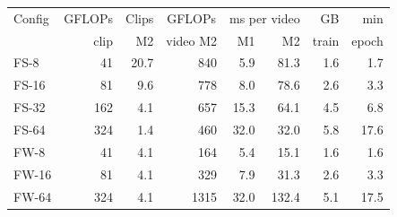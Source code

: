 \begin{tabular}{lrrrrrrr}
\toprule
Config & \multicolumn{1}{c}{GFLOPs} & Clips & \multicolumn{1}{c}{GFLOPs} & \multicolumn{2}{c}{ms per video} & GB & min \\
 & clip & M2 & video M2 & M1 & M2 & train & epoch \\
\midrule
FS-8 & 41 & 20.7 & 840 & 5.9 & 81.3 & 1.6 & 1.7 \\
FS-16 & 81 & 9.6 & 778 & 8.0 & 78.6 & 2.6 & 3.3 \\
FS-32 & 162 & 4.1 & 657 & 15.3 & 64.1 & 4.5 & 6.8 \\
FS-64 & 324 & 1.4 & 460 & 32.0 & 32.0 & 5.8 & 17.6 \\
FW-8 & 41 & 4.1 & 164 & 5.4 & 15.1 & 1.6 & 1.6 \\
FW-16 & 81 & 4.1 & 329 & 7.9 & 31.3 & 2.6 & 3.3 \\
FW-64 & 324 & 4.1 & 1315 & 32.0 & 132.4 & 5.1 & 17.5 \\
\bottomrule
\end{tabular}
